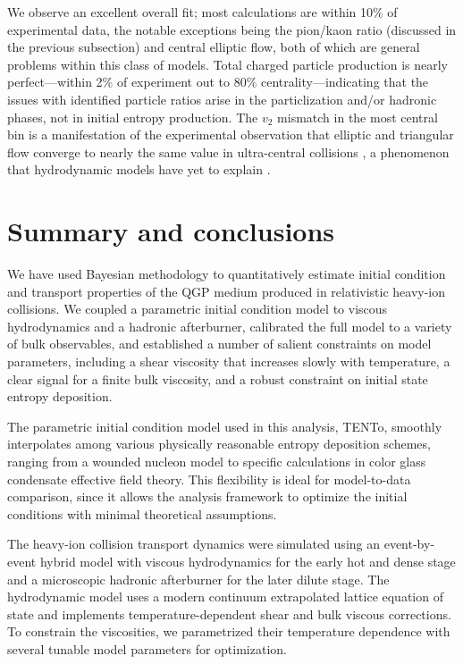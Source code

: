 \documentclass[aps,prc,reprint,amsmath,nofootinbib]{revtex4-1}
\newcommand{\trento}{T\raisebox{-0.5ex}{R}ENTo}
\begin{document}
We observe an excellent overall fit; most calculations are within 10\% of experimental data, the notable exceptions being the pion/kaon ratio (discussed in the previous subsection) and central elliptic flow, both of which are general problems within this class of models.
Total charged particle production is nearly perfect---within 2\% of experiment out to 80\% centrality---indicating that the issues with identified particle ratios arise in the particlization and/or hadronic phases, not in initial entropy production.
The $v_2$ mismatch in the most central bin is a manifestation of the experimental observation that elliptic and triangular flow converge to nearly the same value in ultra-central collisions \cite{CMS:2013bza}, a phenomenon that hydrodynamic models have yet to explain \cite{Denicol:2014ywa,Shen:2015qta}.


\section{Summary and conclusions}

We have used Bayesian methodology to quantitatively estimate initial condition and transport properties of the QGP medium produced in relativistic heavy-ion collisions.
We coupled a parametric initial condition model to viscous hydrodynamics and a hadronic afterburner, calibrated the full model to a variety of bulk observables, and established a number of salient constraints on model parameters, including a shear viscosity that increases slowly with temperature, a clear signal for a finite bulk viscosity, and a robust constraint on initial state entropy deposition.

The parametric initial condition model used in this analysis, \trento, smoothly interpolates among various physically reasonable entropy deposition schemes, ranging from a wounded nucleon model to specific calculations in color glass condensate effective field theory.
This flexibility is ideal for model-to-data comparison, since it allows the analysis framework to optimize the initial conditions with minimal theoretical assumptions.

The heavy-ion collision transport dynamics were simulated using an event-by-event hybrid model with viscous hydrodynamics for the early hot and dense stage and a microscopic hadronic afterburner for the later dilute stage.
The hydrodynamic model uses a modern continuum extrapolated lattice equation of state and implements temperature-dependent shear and bulk viscous corrections.
To constrain the viscosities, we parametrized their temperature dependence with several tunable model parameters for optimization.
\end{document}

